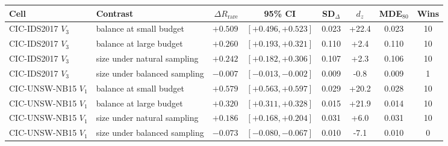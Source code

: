 \begin{tabular}{@{}llrccccc@{}}
\toprule
Cell & Contrast & $\Delta R_{\mathrm{rare}}$ & 95\% CI & SD$_\Delta$ & $d_z$ & MDE$_{80}$ & Wins \\
\midrule
CIC-IDS2017 $V_3$ & balance at small budget & $+0.509$ & $[+0.496,+0.523]$ & 0.023 & +22.4 & 0.023 & 10 \\
CIC-IDS2017 $V_3$ & balance at large budget & $+0.260$ & $[+0.193,+0.321]$ & 0.110 & +2.4 & 0.110 & 10 \\
CIC-IDS2017 $V_3$ & size under natural sampling & $+0.242$ & $[+0.182,+0.306]$ & 0.107 & +2.3 & 0.106 & 10 \\
CIC-IDS2017 $V_3$ & size under balanced sampling & $-0.007$ & $[-0.013,-0.002]$ & 0.009 & -0.8 & 0.009 & 1 \\
CIC-UNSW-NB15 $V_1$ & balance at small budget & $+0.579$ & $[+0.563,+0.597]$ & 0.029 & +20.2 & 0.028 & 10 \\
CIC-UNSW-NB15 $V_1$ & balance at large budget & $+0.320$ & $[+0.311,+0.328]$ & 0.015 & +21.9 & 0.014 & 10 \\
CIC-UNSW-NB15 $V_1$ & size under natural sampling & $+0.186$ & $[+0.168,+0.204]$ & 0.031 & +6.0 & 0.031 & 10 \\
CIC-UNSW-NB15 $V_1$ & size under balanced sampling & $-0.073$ & $[-0.080,-0.067]$ & 0.010 & -7.1 & 0.010 & 0 \\
\bottomrule
\end{tabular}
